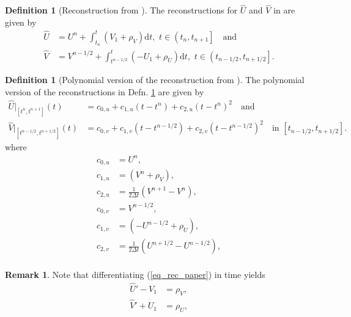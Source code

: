 \documentclass[12pt,a4paper]{article}
\numberwithin{equation}{section}
\theoremstyle{definition}
\newcommand{\qp}[1]{\left(#1\right)}
\newcommand{\qpb}[1]{\left(#1\right]}
\newcommand{\qb}[1]{\left[#1\right]}
\newcommand{\rec}[1]{\widehat{{#1}}}
\newtheorem{Defn}[subsection]{Definition}
\newtheorem{Rem}[subsection]{Remark}
\begin{document}
\begin{Defn}[Reconstruction from \cite{georgoulis2016posteriori}]\label{defn_rec_paper}
The reconstructions for $\rec{U}$ and $\rec{V}$ in \cite[\S3.1]{georgoulis2016posteriori} are given by 
\begin{equation}\label{eq_rec_paper}
\begin{aligned}
\hat{U}&=U^n +\int_{t_n}^{t}\left(V_1+\rho_V\right)\mathrm{d}t, \,\, t\in\qpb{t_n,t_{n+1}}\quad \text{and}\\
\hat{V}&=V^{n-1/2}+\int_{t^{n-1/2}}^{t}\left(-U_1+\rho_U\right)\mathrm{d}t, \,\, t\in\qpb{t_{n-1/2},t_{n+1/2}}.
\end{aligned}
\end{equation}
\end{Defn}

\begin{Defn}[Polynomial version of the reconstruction from \cite{georgoulis2016posteriori}]\label{defn_rec_paper_poly}
	The polynomial version of the reconstructions in Defn. \ref{defn_rec_paper} are given by 
	\begin{equation}\label{eq_rec_paper_poly}
	\begin{aligned}
	\hat{U}|_{\qb{t^n, t^{n+1}}}\qp{t}&=c_{0,u}+c_{1,u}\qp{t-t^n}+c_{2,u}\qp{t-t^n}^2\quad \text{and}\\
	\hat{V}|_{\qb{t^{n-1/2}, t^{n+1/2}}}\qp{t}&=c_{0,v}+c_{1,v}\qp{t-t^{n-1/2}}+c_{2,v}\qp{t-t^{n-1/2}}^2\quad\text{in }\qb{t_{n-1/2},t_{n+1/2}}.
	\end{aligned}
	\end{equation}
	where
	\begin{equation}
\begin{aligned}
c_{0,u} &= U^n,\\
c_{1,u}&= (V^n+\rho_V),\\
c_{2,u}&=\frac{1}{2\Delta t}\qp{V^{n+1}-V^n},\\
c_{0,v} &= V^{n-1/2},\\
c_{1,v}&= (-U^{n-1/2}+\rho_U),\\
c_{2,v}&=\frac{1}{2\Delta t}\qp{U^{n+1/2}-U^{n-1/2}},\\
\end{aligned}
	\end{equation}
\end{Defn}
\begin{Rem}
Note that differentiating (\ref{eq_rec_paper}) in time yields
\begin{equation}\label{eq_model_recs}
\begin{aligned}
\rec{U}'-V_1&=\rho_V,\\
\rec{V}'+U_1&=\rho_U,
\end{aligned}
\end{equation}
\end{Rem}
\end{document}

